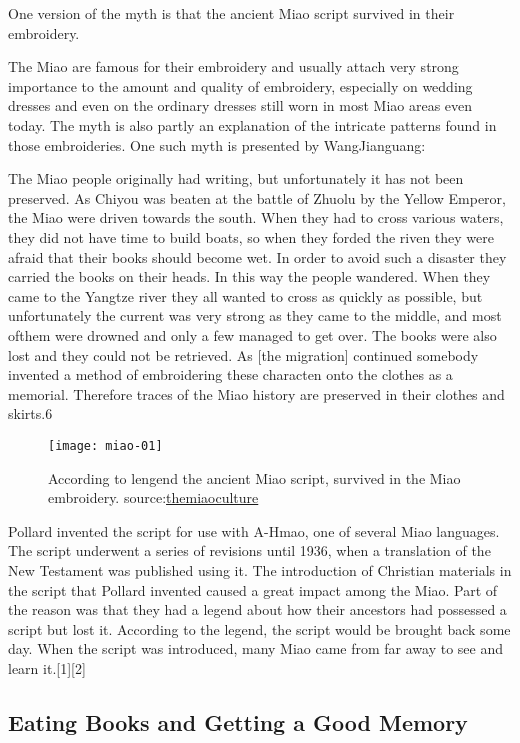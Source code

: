 One version of the myth is that the ancient Miao script survived in their embroidery.

The Miao are
famous for their embroidery and usually attach very strong importance to
the amount and quality of embroidery, especially on wedding dresses and
even on the ordinary dresses still worn in most Miao areas even today. The
myth is also partly an explanation of the intricate patterns found in those
embroideries. One such myth is presented by WangJianguang:

\begin{latexquote}
The Miao people originally had writing, but unfortunately it has not been preserved.
As Chiyou was beaten at the battle of Zhuolu by the Yellow Emperor, the Miao
were driven towards the south. When they had to cross various waters, they did not
have time to build boats, so when they forded the riven they were afraid that their
books should become wet. In order to avoid such a disaster they carried the books
on their heads. In this way the people wandered. When they came to the Yangtze
river they all wanted to cross as quickly as possible, but unfortunately the current was
very strong as they came to the middle, and most ofthem were drowned and only a
few managed to get over. The books were also lost and they could not be retrieved.
As [the migration] continued somebody invented a method of embroidering these
characten onto the clothes as a memorial. Therefore traces of the Miao history are
preserved in their clothes and skirts.6
\end{latexquote}

\begin{figure}[htp]
\texttt{[image: miao-01]}
\caption{According to lengend the ancient Miao script, survived in the Miao embroidery.
source:\protect\href{http://themiaoculture.tumblr.com/}{themiaoculture}}
\end{figure}
Pollard invented the script for use with A-Hmao, one of several Miao languages. The script underwent a series of revisions until 1936, when a translation of the New Testament was published using it. The introduction of Christian materials in the script that Pollard invented caused a great impact among the Miao. Part of the reason was that they had a legend about how their ancestors had possessed a script but lost it. According to the legend, the script would be brought back some day. When the script was introduced, many Miao came from far away to see and learn it.[1][2]

\subsection{Eating Books and Getting a Good Memory}

